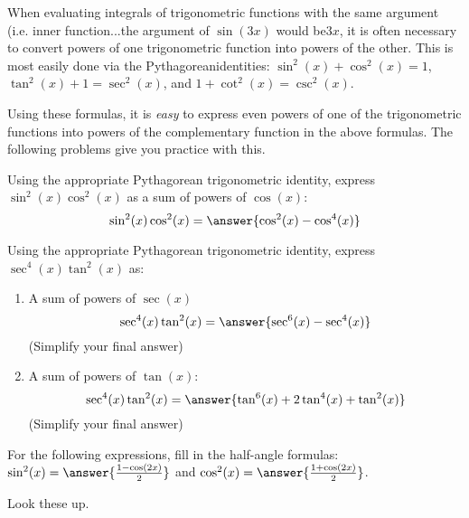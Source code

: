 \documentclass{ximera}
\begin{document}
\begin{problem}
  When evaluating integrals of trigonometric functions with the same argument​ (i.e. inner function...the argument of $\sin(3x)$ would be​ $3x$, it is often necessary to convert powers of one trigonometric function into powers of the other.
    This is most easily done via the Pythagorean​ identities: $\sin^2(x) + \cos^2(x) = 1$, $\tan^2(x) + 1 = \sec^2(x)$, and $1 + \cot^2(x) = \csc^2(x)$.
    
    Using these​ formulas, it is \emph{easy} to express even powers of one of the trigonometric functions into powers of the complementary function in the above formulas.
    The following problems give you practice with this.
  \begin{multipleChoice}
  \end{multipleChoice}
\end{problem}

\begin{problem}
  Using the appropriate Pythagorean trigonometric​ identity, express $\sin^2(x) \cos^2(x)$ as a sum of powers of $\cos(x)$:
  \[
    \sin^2(x) \cos^2(x) = \answer{\cos^2(x) - \cos^4(x)}
  \]
\end{problem}

\begin{problem}
  Using the appropriate Pythagorean trigonometric​ identity, express $\sec^4(x) \tan^2(x)$ as:
  \begin{enumerate}
    \item A sum of powers of $\sec(x)$
      \[
        \sec^4(x) \tan^2(x) = \answer{\sec^6(x) - \sec^4(x)}
      \]
      (Simplify your final answer)
    \item A sum of powers of $\tan(x)$:
      \[
        \sec^4(x) \tan^2(x) = \answer{\tan^6(x) + 2\tan^4(x) + \tan^2(x)}
      \]
      (Simplify your final answer)
  \end{enumerate}
\end{problem}

\begin{problem}
  For the following expressions, fill in the half-angle formulas:
  $\sin^2(x) = \answer{\frac{1 - \cos(2x)}{2}}$ and $\cos^2(x) = \answer{\frac{1 + \cos(2x)}{2}}$.  
  
  \begin{hint}
    Look these up.
  \end{hint}
\end{problem}
\end{document}
